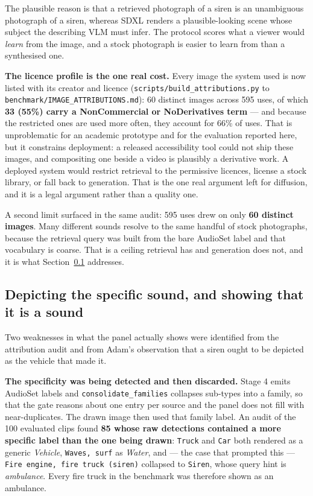\documentclass[11pt,a4paper]{article}
\begin{document}
The plausible reason is that a retrieved photograph of a siren is an unambiguous photograph of a
siren, whereas SDXL renders a plausible-looking scene whose subject the describing VLM must infer.
The protocol scores what a viewer would \emph{learn} from the image, and a stock photograph is easier
to learn from than a synthesised one.

\textbf{The licence profile is the one real cost.} Every image the system used is now listed with
its creator and licence (\texttt{scripts/build\_attributions.py} to
\texttt{benchmark/IMAGE\_ATTRIBUTIONS.md}): 60 distinct images across 595 uses, of which
\textbf{33 (55\%) carry a NonCommercial or NoDerivatives term} --- and because the restricted ones are
used more often, they account for 66\% of uses. That is unproblematic for an academic prototype and
for the evaluation reported here, but it constrains deployment: a released accessibility tool could
not ship these images, and compositing one beside a video is plausibly a derivative work. A deployed
system would restrict retrieval to the permissive licences, license a stock library, or fall back to
generation. That is the one real argument left for diffusion, and it is a legal argument rather than
a quality one.

A second limit surfaced in the same audit: 595 uses drew on only \textbf{60 distinct images}. Many
different sounds resolve to the same handful of stock photographs, because the retrieval query was
built from the bare AudioSet label and that vocabulary is coarse. That is a ceiling retrieval has and
generation does not, and it is what Section~\ref{sec:specificity} addresses.

\subsection{Depicting the specific sound, and showing that it is a sound}\label{sec:specificity}
Two weaknesses in what the panel actually shows were identified from the attribution audit and from
Adam's observation that a siren ought to be depicted as the vehicle that made it.

\textbf{The specificity was being detected and then discarded.} Stage 4 emits AudioSet labels and
\texttt{consolidate\_families} collapses sub-types into a family, so that the gate reasons about one
entry per source and the panel does not fill with near-duplicates. The drawn image then used that
family label. An audit of the 100 evaluated clips found \textbf{85 whose raw detections contained a
more specific label than the one being drawn}: \texttt{Truck} and \texttt{Car} both rendered as a
generic \emph{Vehicle}, \texttt{Waves, surf} as \emph{Water}, and --- the case that prompted this ---
\texttt{Fire engine, fire truck (siren)} collapsed to \texttt{Siren}, whose query hint is
\emph{ambulance}. Every fire truck in the benchmark was therefore shown as an ambulance.
\end{document}
